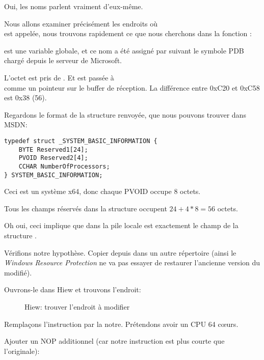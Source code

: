 Oui, les noms parlent vraiment d'eux-même.

Nous allons examiner précisément les endroits où\\
 est appelée,
nous trouvons rapidement ce que nous cherchons dans la fonction :



 est une variable globale, et ce nom a été assigné par \IDA suivant
le symbole \gls{PDB} chargé depuis le serveur de Microsoft.

L'octet est pris de .
Et  est passée à\\
 comme un pointeur sur le buffer de réception.
La différence entre 0xC20 et 0xC58 est 0x38 (56).

Regardons le format de la structure renvoyée, que nous pouvons trouver dans MSDN:

\begin{lstlisting}[style=customc]
typedef struct _SYSTEM_BASIC_INFORMATION {
    BYTE Reserved1[24];
    PVOID Reserved2[4];
    CCHAR NumberOfProcessors;
} SYSTEM_BASIC_INFORMATION;
\end{lstlisting}

Ceci est un système x64, donc chaque PVOID occupe 8 octets.

Tous les champs réservés dans la structure occupent $24+4*8=56$ octets.

Oh oui, ceci implique que  dans la pile locale est exactement le champ
 de la structure .

Vérifions notre hypothèse.
Copier  depuis 
dans un autre répertoire (ainsi le \emph{Windows Resource Protection} ne va pas essayer
de restaurer l'ancienne version du  modifié).

Ouvrons-le dans Hiew et trouvons l'endroit:

\begin{figure}[H]
\centering
{}
\caption{Hiew: trouver l'endroit à modifier}
\end{figure}

Remplaçons l'instruction   par la notre.
Prétendons avoir un CPU 64 c\oe{}urs.

Ajouter un \ac{NOP} additionnel (car notre instruction est plus courte que l'originale):

